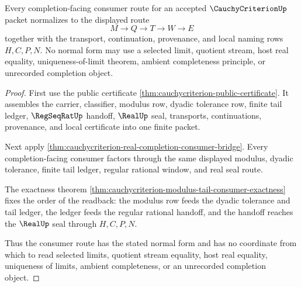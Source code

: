 \begin{theorem}
\label{thm:cauchycriterion-completion-facing-readback-normal-form}
Every completion-facing consumer route for an accepted $\CauchyCriterionUp$
packet normalizes to the displayed route
$$
M \to Q \to T \to W \to E
$$
together with the transport, continuation, provenance, and local naming rows
$H,C,P,N$. No normal form may use a selected limit, quotient stream, host real
equality, uniqueness-of-limit theorem, ambient completeness principle, or
unrecorded completion object.
\end{theorem}
\begin{proof}
First use the public certificate
\autoref{thm:cauchycriterion-public-certificate}. It assembles the carrier,
classifier, modulus row, dyadic tolerance row, finite tail ledger,
$\RegSeqRatUp$ handoff, $\RealUp$ seal, transports, continuations,
provenance, and local certificate into one finite packet.

Next apply
\autoref{thm:cauchycriterion-real-completion-consumer-bridge}. Every
completion-facing consumer factors through the same displayed modulus,
dyadic tolerance, finite tail ledger, regular rational window, and real seal
route.

The exactness theorem
\autoref{thm:cauchycriterion-modulus-tail-consumer-exactness} fixes the order
of the readback: the modulus row feeds the dyadic tolerance and tail ledger,
the ledger feeds the regular rational handoff, and the handoff reaches the
$\RealUp$ seal through $H,C,P,N$.

Thus the consumer route has the stated normal form and has no coordinate from
which to read selected limits, quotient stream equality, host real equality,
uniqueness of limits, ambient completeness, or an unrecorded completion
object.
\end{proof}


